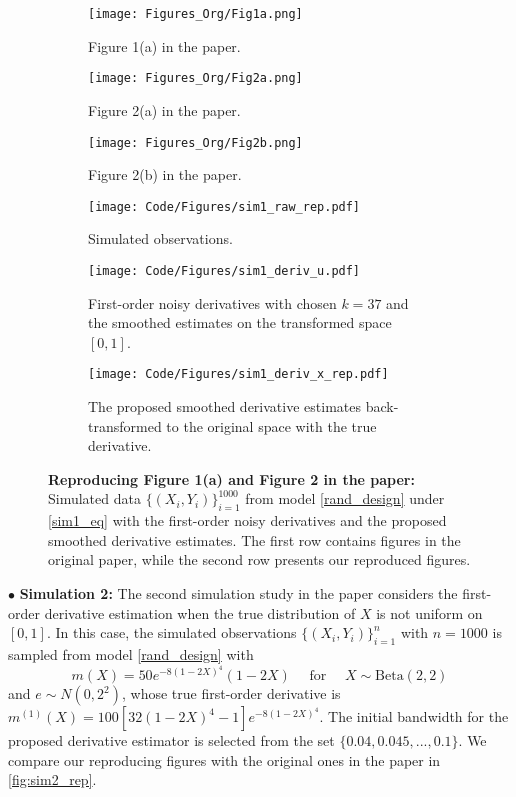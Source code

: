 \documentclass{uwstat572}
\theoremstyle{definition}
\theoremstyle{theorem}
\begin{document}
\begin{figure}[t]
	\captionsetup[subfigure]{justification=centering}
	\begin{subfigure}[t]{0.32\linewidth}
		\centering
		\texttt{[image: Figures\_Org/Fig1a.png]}
		\caption{Figure 1(a) in the paper.}
	\end{subfigure}
	\hfil
	\begin{subfigure}[t]{0.32\linewidth}
		\centering
		\texttt{[image: Figures\_Org/Fig2a.png]}
		\caption{Figure 2(a) in the paper.}
	\end{subfigure}
    \hfil
    \begin{subfigure}[t]{0.32\linewidth}
    	\centering
    	\texttt{[image: Figures\_Org/Fig2b.png]}
    	\caption{Figure 2(b) in the paper.}
    \end{subfigure}
    \begin{subfigure}[t]{0.32\linewidth}
    	\centering
    	\texttt{[image: Code/Figures/sim1\_raw\_rep.pdf]}
    	\caption{Simulated observations.}
    \end{subfigure}
    \hfil
    \begin{subfigure}[t]{0.32\linewidth}
    	\centering
    	\texttt{[image: Code/Figures/sim1\_deriv\_u.pdf]}
    	\caption{First-order noisy derivatives with chosen $k=37$ and the smoothed estimates on the transformed space $[0,1]$.}
    \end{subfigure}
    \hfil
    \begin{subfigure}[t]{0.32\linewidth}
    	\centering
    	\texttt{[image: Code/Figures/sim1\_deriv\_x\_rep.pdf]}
    	\caption{The proposed smoothed derivative estimates back-transformed to the original space with the true derivative.}
    \end{subfigure}
	\caption{{\bf Reproducing Figure 1(a) and Figure 2 in the paper:} Simulated data $\{(X_i,Y_i)\}_{i=1}^{1000}$ from model \eqref{rand_design} under \eqref{sim1_eq} with the first-order noisy derivatives and the proposed smoothed derivative estimates. The first row contains figures in the original paper, while the second row presents our reproduced figures.}
	\label{fig:sim1_rep}
\end{figure}


$\bullet$ {\bf Simulation 2:} The second simulation study in the paper \citep{liu2020smoothed} considers the first-order derivative estimation when the true distribution of $X$ is not uniform on $[0,1]$. In this case, the simulated observations $\{(X_i,Y_i)\}_{i=1}^n$ with $n=1000$ is sampled from model \eqref{rand_design} with
\begin{equation}
\label{sim2_eq}
m(X) = 50e^{-8(1-2X)^4} (1-2X)\quad \text{ for } \quad X\sim \mathrm{Beta}(2,2)
\end{equation}
and $e\sim N(0,2^2)$, whose true first-order derivative is $m^{(1)}(X) = 100\left[32(1-2X)^4 -1\right] e^{-8(1-2X)^4}$. The initial bandwidth for the proposed derivative estimator is selected from the set $\{0.04, 0.045,...,0.1\}$. We compare our reproducing figures with the original ones in the paper in \autoref{fig:sim2_rep}.
\end{document}
